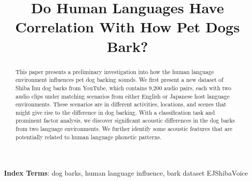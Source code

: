 \documentclass{INTERSPEECH2023}
\title{Do Human Languages Have Correlation With How Pet Dogs Bark?}
\begin{document}
\maketitle
 
\begin{abstract}
This paper presents a preliminary investigation into how the human language environment influences pet dog barking sounds.
We first present a new dataset of Shiba Inu dog barks from YouTube, which contains 9,200 audio pairs, each with two audio clips under matching scenarios from either English or Japanese host language environments. 
These scenarios are in different activities, locations, and scenes that might give rise to the difference in dog barking. With a classification task and prominent factor analysis, we discover significant acoustic differences in the dog barks from two language environments. We further identify some acoustic features that are potentially related to human language phonetic patterns.
\end{abstract}
\noindent\textbf{Index Terms}: dog barks, human language influence, bark dataset EJShibaVoice













\end{document}
